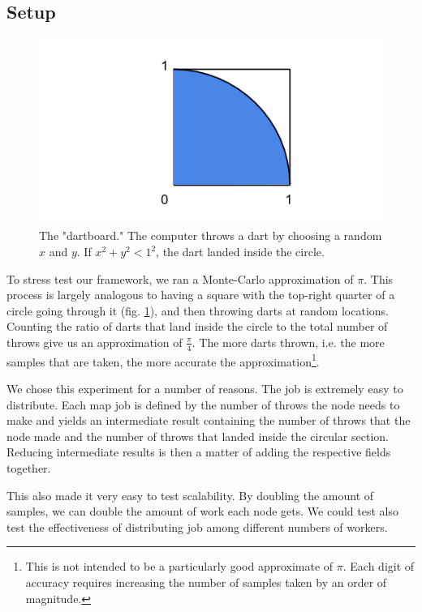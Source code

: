 \documentclass[conference, compsocconf, letterpaper]{IEEEtran}
\begin{document}
\subsection{Setup}
\begin{figure}
    \includegraphics[width=\linewidth]{dartboard}
    \caption{The "dartboard." The computer throws a dart by choosing a random $x$ and $y$.  If $x^{2} + y^{2} < 1^{2} $, the dart landed inside the circle.}
    \label{dartboard}
\end{figure}


To stress test our framework, we ran a Monte-Carlo approximation of $\pi$. This process is largely analogous to having a square with the top-right quarter of a circle going through it (fig. \ref{dartboard}), and then throwing darts at random locations. Counting the ratio of darts that land inside the circle to the total number of throws give us an approximation of $\frac{\pi}{4}$.  The more darts thrown, i.e. the more samples that are taken, the more accurate the approximation\footnote{This is not intended to be a particularly good approximate of $\pi$. Each digit of accuracy requires increasing the number of samples taken by an order of magnitude.}.

We chose this experiment for a number of reasons. The job is extremely easy to distribute. Each map job is defined by the number of throws the node needs to make and yields an intermediate result containing the number of throws that the node made and the number of throws that landed inside the circular section.  Reducing intermediate results is then a matter of adding the respective fields together. 

This also made it very easy to test scalability. By doubling the amount of samples, we can double the amount of work each node gets.  We could test also test the effectiveness of distributing job among different numbers of workers. 
\end{document}
